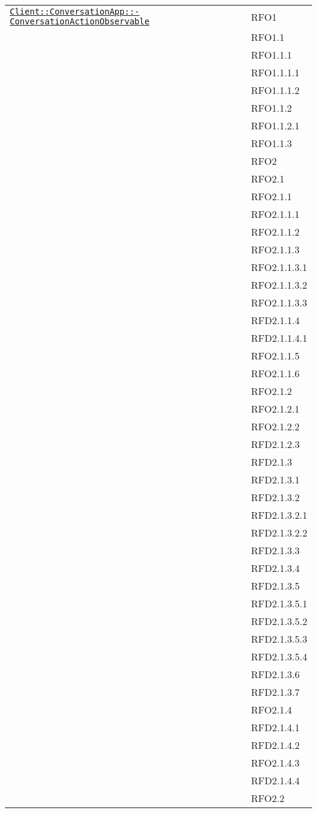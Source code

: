 \begin{longtable}{|>{\centering}m{10cm}|m{3cm}<{\centering}|}
\hyperref[Client::ConversationApp::ConversationActionObservable]{\texttt{Client::ConversationApp::-\linebreak ConversationActionObservable}} & RFO1\\
& RFO1.1\\
& RFO1.1.1\\
& RFO1.1.1.1\\
& RFO1.1.1.2\\
& RFO1.1.2\\
& RFO1.1.2.1\\
& RFO1.1.3\\
& RFO2\\
& RFO2.1\\
& RFO2.1.1\\
& RFO2.1.1.1\\
& RFO2.1.1.2\\
& RFO2.1.1.3\\
& RFO2.1.1.3.1\\
& RFO2.1.1.3.2\\
& RFO2.1.1.3.3\\
& RFD2.1.1.4\\
& RFD2.1.1.4.1\\
& RFO2.1.1.5\\
& RFO2.1.1.6\\
& RFO2.1.2\\
& RFO2.1.2.1\\
& RFO2.1.2.2\\
& RFD2.1.2.3\\
& RFD2.1.3\\
& RFD2.1.3.1\\
& RFD2.1.3.2\\
& RFD2.1.3.2.1\\
& RFD2.1.3.2.2\\
& RFD2.1.3.3\\
& RFD2.1.3.4\\
& RFD2.1.3.5\\
& RFD2.1.3.5.1\\
& RFD2.1.3.5.2\\
& RFD2.1.3.5.3\\
& RFD2.1.3.5.4\\
& RFD2.1.3.6\\
& RFD2.1.3.7\\
& RFO2.1.4\\
& RFD2.1.4.1\\
& RFD2.1.4.2\\
& RFO2.1.4.3\\
& RFD2.1.4.4\\
& RFO2.2\\

\end{longtable}
